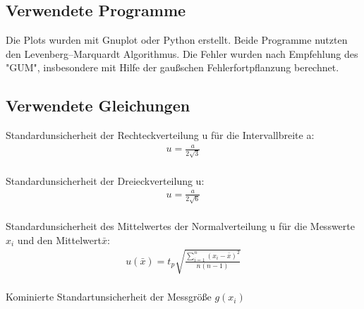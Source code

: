 \subsection{Verwendete Programme}
Die Plots wurden mit Gnuplot oder Python erstellt. Beide Programme nutzten den  Levenberg–Marquardt Algorithmus. Die Fehler wurden nach Empfehlung des "GUM", insbesondere mit Hilfe der gaußschen Fehlerfortpflanzung berechnet.

\subsection{Verwendete Gleichungen}\label{VGuD}









Standardunsicherheit der Rechteckverteilung u für die Intervallbreite a:
\begin{align}
	u=\frac{a}{2\sqrt{3}}\label{eq:sur}
\end{align} \\

Standardunsicherheit der Dreieckverteilung u: \begin{align}
	u=\frac{a}{2\sqrt{6}}\label{eq:sud}
\end{align}\\

Standardunsicherheit des Mittelwertes der Normalverteilung u für die Messwerte $x_i$ und den Mittelwert$\bar{x}$:
\begin{align}
	u(\bar{x})=  t_p  \sqrt{  \frac{\sum_{i=1}^{n}  (x_i-\bar{x})^2} {n (n-1)} }
	\label{eq:sunv}       
\end{align} \\

Kominierte Standartunsicherheit der Messgröße $g(x_i)$


